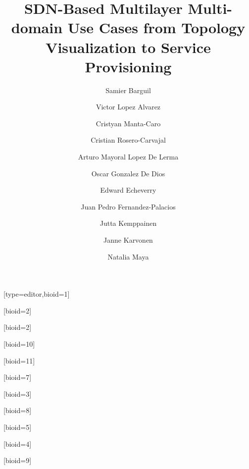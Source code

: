 \documentclass[a4paper,fleqn]{cas-dc}
\begin{document}
\let\WriteBookmarks\relax
\def\floatpagepagefraction{1}
\def\textpagefraction{.001}

\title [mode = title]{SDN-Based Multilayer Multi-domain Use Cases from Topology Visualization to Service Provisioning}                      



\author[1,4]{Samier Barguil}[type=editor,bioid=1]
\cormark[1]

\author[2]{Victor Lopez Alvarez}[bioid=2]

\author[4]{Cristyan Manta-Caro}[bioid=2]

\author[4]{Cristian Rosero-Carvajal}[bioid=10]

\author[2]{Arturo Mayoral Lopez De Lerma}[bioid=11]

\author[2]{Oscar Gonzalez De Dios}[bioid=7]

\author[3]{Edward Echeverry}[bioid=3]

\author[2]{Juan Pedro Fernandez-Palacios}[bioid=8]

\author[5]{Jutta Kemppainen}[bioid=5]

\author[5]{Janne Karvonen}[bioid=4]

\author[5]{Natalia Maya}[bioid=9]

\address[1]{Universidad Autonoma de Madrid, Madrid, Spain}
\address[2]{Telefonica I+D, Ronda de la Comunicacion, Madrid, Spain}
\address[3]{Telefonica Movistar, Transversal 60 No 114ª -55. Bogotá, Colombia}
\address[4]{Wipro Technologies Ltd., Doddakannelli, Sarjapur Road
Bengaluru - 560 035, India}
\address[5]{Infinera Corporation, 140 Caspian Court, Sunnyvale, CA 94089, USA}

\end{document}
